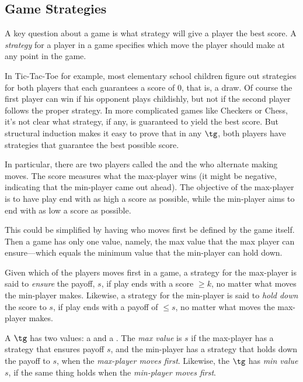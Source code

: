 \subsection{Game Strategies}

A key question about a game is what strategy will give a player the best
score.  A \emph{strategy} for a player in a game specifies which move the
player should make at any point in the game.

In Tic-Tac-Toe for example, most elementary school children figure out
strategies for both players that each guarantees a score of 0, that is, a
draw.  Of course the first player can win if his opponent plays
childishly, but not if the second player follows the proper strategy.  In
more complicated games like Checkers or Chess, it's not clear what
strategy, if any, is guaranteed to yield the best score.
But structural induction makes it easy to prove that in any $\tg$,
both players have strategies that guarantee the best possible score.

In particular, there are two players called the  and the
 who alternate making moves.  The score measures what the
max-player wins (it might be negative, indicating that the min-player came
out ahead).  The objective of the max-player is to have play end with as
high a score as possible, while the min-player aims to end with as low a
score as possible.

\begin{editingnotes}
This could be simplified by having who moves first be defined by the
game itself.  Then a game has only one value, namely, the max value
that the max player can ensure---which equals the minimum value that
the min-player can hold down.
\end{editingnotes}

Given which of the players moves first in a game, a strategy for the
max-player is said to \emph{ensure} the payoff, $s$, if play ends with a
score $ \ge k$, no matter what moves the min-player makes.  Likewise, a
strategy for the min-player is said to \emph{hold down} the score to $s$,
if play ends with a payoff of $\le s$, no matter what moves the max-player
makes.

A $\tg$ has two values: a  and a .
The \emph{max value} is $s$ if the max-player has a strategy that
ensures payoff $s$, and the min-player has a strategy that holds down
the payoff to $s$, when the \emph{max-player moves first}.  Likewise,
the $\tg$ has \emph{min value} $s$, if the same thing holds when the
\emph{min-player moves first}.

